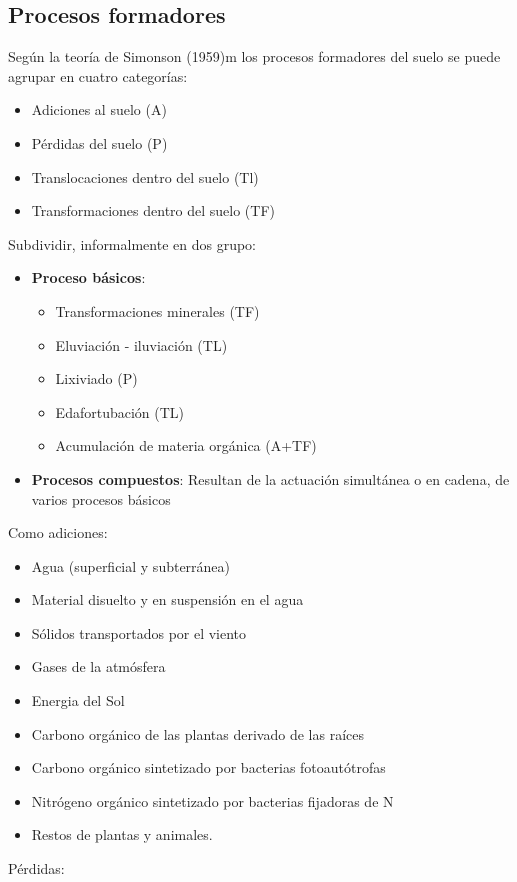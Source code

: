 \subsection{Procesos formadores}
Según la teoría de Simonson (1959)m los procesos formadores del suelo se puede agrupar en cuatro categorías:
\begin{itemize}
    \item Adiciones al suelo (A)
    \item Pérdidas del suelo (P)
    \item Translocaciones dentro del suelo (Tl)
    \item Transformaciones dentro del suelo (TF)
\end{itemize}
Subdividir, informalmente en dos grupo:
\begin{itemize}
    \item \textbf{Proceso básicos}: 
    \begin{itemize}
        \item Transformaciones minerales (TF)
        \item Eluviación - iluviación (TL)
        \item Lixiviado (P)
        \item Edafortubación (TL)
        \item Acumulación de materia orgánica (A+TF)
    \end{itemize}
    \item \textbf{Procesos compuestos}: Resultan de la actuación simultánea o en cadena, de varios procesos básicos
\end{itemize}
Como adiciones:
\begin{itemize}
    \item Agua (superficial y subterránea)
    \item Material disuelto y en suspensión en el agua
    \item Sólidos transportados por el viento
    \item Gases de la atmósfera
    \item Energia del Sol
    \item Carbono orgánico de las plantas derivado de las raíces
    \item Carbono orgánico sintetizado por bacterias fotoautótrofas
    \item Nitrógeno orgánico sintetizado por bacterias fijadoras de N
    \item Restos de plantas y animales.
\end{itemize}
Pérdidas:
